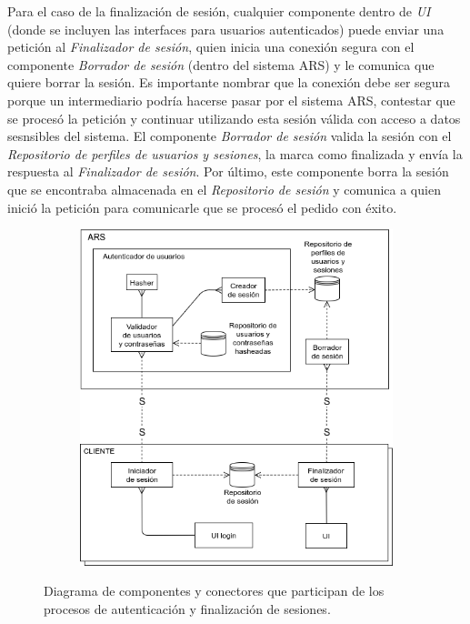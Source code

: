 \par Para el caso de la finalización de sesión, cualquier componente dentro de \textit{UI} (donde se incluyen las interfaces para usuarios autenticados) puede enviar una petición al \textit{Finalizador de sesión}, quien inicia una conexión segura con el componente \textit{Borrador de sesión} (dentro del sistema ARS) y le comunica que quiere borrar la sesión. Es importante nombrar que la conexión debe ser segura porque un intermediario podría hacerse pasar por el sistema ARS, contestar que se procesó la petición y continuar utilizando esta sesión válida con acceso a datos sesnsibles del sistema. El componente \textit{Borrador de sesión} valida la sesión con el \textit{Repositorio de perfiles de usuarios y sesiones}, la marca como finalizada y envía la respuesta al \textit{Finalizador de sesión}. Por último, este componente borra la sesión que se encontraba almacenada en el \textit{Repositorio de sesión} y comunica a quien inició la petición para comunicarle que se procesó el pedido con éxito.

\begin{figure}[H]
  \begin{subfigure}{\textwidth}
    \includegraphics[width=\textwidth]{imagenes/diagramas/loginYLogout.png}
  \end{subfigure}
  \caption{Diagrama de componentes y conectores que participan de los procesos de autenticación y finalización de sesiones.}
  \label{fig:dia_cyc_autenticacion}
\end{figure}



\newpage
